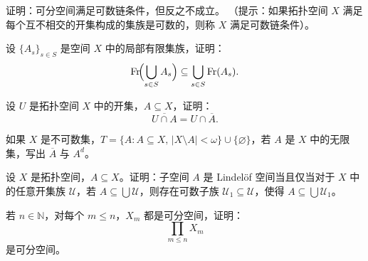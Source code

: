 \begin{exercise}
证明：可分空间满足可数链条件，但反之不成立。
（提示：如果拓扑空间 $X$ 满足每个互不相交的开集构成的集族是可数的，则称 $X$ 满足可数链条件）。
\end{exercise}

\begin{exercise}
设 $\{A_s\}_{s\in S}$ 是空间 $X$ 中的局部有限集族，证明：
\[
  \mathrm{Fr}\!\Bigl(\bigcup_{s\in S} A_s\Bigr)\subseteq \bigcup_{s\in S}\mathrm{Fr}(A_s).
\]
\end{exercise}

\begin{exercise}
设 $U$ 是拓扑空间 $X$ 中的开集，$A\subseteq X$，证明：
\[
  \overline{U\cap A} = U\cap \overline{A}.
\]
\end{exercise}

\begin{exercise}
如果 $X$ 是不可数集，$T=\{A:A\subseteq X,\,|X\setminus A|<\omega\}\cup\{\varnothing\}$，若 $A$ 是 $X$ 中的无限集，写出 $\overline{A}$ 与 $A^d$。
\end{exercise}

\begin{exercise}
设 $X$ 是拓扑空间，$A\subseteq X$。证明：子空间 $A$ 是 Lindelöf 空间当且仅当对于 $X$ 中的任意开集族 $\mathcal{U}$，若 $A\subseteq\bigcup\mathcal{U}$，则存在可数子族 $\mathcal{U}_1\subseteq\mathcal{U}$，使得 $A\subseteq\bigcup\mathcal{U}_1$。
\end{exercise}

\begin{exercise}
若 $n\in \mathbb{N}$，对每个 $m\leq n$，$X_m$ 都是可分空间，证明：
\[
  \prod_{m\leq n} X_m
\]
是可分空间。
\end{exercise}

